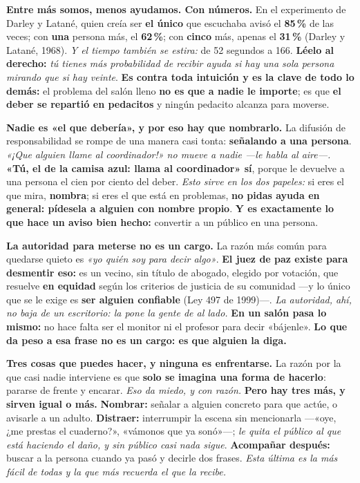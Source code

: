 \documentclass[11pt,letterpaper]{article}
\newcommand{\milcpaso}[3]{%
\Needspace{4\baselineskip}%
\begin{tcolorbox}[enhanced,colback=white,colframe=milcLinea,arc=1.5mm,boxrule=.9pt,
  left=14mm,right=4mm,top=3mm,bottom=3mm,before skip=4pt,after skip=4pt,
  fontupper=\RaggedRight,
  overlay={\node[anchor=north west,circle,fill=#2,text=white,inner sep=0pt,
    minimum size=7.4mm,font=\sffamily\bfseries\small]
    at ([xshift=3.6mm,yshift=-3.2mm]frame.north west) {#1};}]
#3
\end{tcolorbox}}
\begin{document}
\milcpaso{1}{milcTurquesa}{\textbf{Entre más somos, menos ayudamos. Con números.} En el experimento de Darley y Latané, quien creía ser \textbf{el único} que escuchaba avisó el \textbf{85\,\%} de las veces; con \textbf{una} persona más, el \textbf{62\,\%}; con \textbf{cinco} más, apenas el \textbf{31\,\%} (Darley y Latané, 1968). \emph{Y el tiempo también se estira:} de 52 segundos a 166. \textbf{Léelo al derecho:} \emph{tú tienes más probabilidad de recibir ayuda si hay una sola persona mirando que si hay veinte}. \textbf{Es contra toda intuición y es la clave de todo lo demás:} el problema del salón lleno \textbf{no es que a nadie le importe}; es que \textbf{el deber se repartió en pedacitos} y ningún pedacito alcanza para moverse.}
\milcpaso{2}{milcTurquesa}{\textbf{Nadie es «el que debería», y por eso hay que nombrarlo.} La difusión de responsabilidad se rompe de una manera casi tonta: \textbf{señalando a una persona}. \emph{«¡Que alguien llame al coordinador!» no mueve a nadie ---le habla al aire---.} \textbf{«Tú, el de la camisa azul: llama al coordinador» sí}, porque le devuelve a una persona el cien por ciento del deber. \emph{Esto sirve en los dos papeles:} si eres el que mira, \textbf{nombra}; si eres el que está en problemas, \textbf{no pidas ayuda en general: pídesela a alguien con nombre propio}. \textbf{Y es exactamente lo que hace un aviso bien hecho:} convertir a un público en una persona.}
\milcpaso{3}{milcTurquesa}{\textbf{La autoridad para meterse no es un cargo.} La razón más común para quedarse quieto es \emph{«yo quién soy para decir algo»}. \textbf{El juez de paz existe para desmentir eso:} es un vecino, sin título de abogado, elegido por votación, que resuelve \textbf{en equidad} según los criterios de justicia de su comunidad ---y lo único que se le exige es \textbf{ser alguien confiable} (Ley 497 de 1999)---. \emph{La autoridad, ahí, no baja de un escritorio: la pone la gente de al lado.} \textbf{En un salón pasa lo mismo:} no hace falta ser el monitor ni el profesor para decir «bájenle». \textbf{Lo que da peso a esa frase no es un cargo: es que alguien la diga.}}
\milcpaso{4}{milcTurquesa}{\textbf{Tres cosas que puedes hacer, y ninguna es enfrentarse.} La razón por la que casi nadie interviene es que \textbf{solo se imagina una forma de hacerlo}: pararse de frente y encarar. \emph{Eso da miedo, y con razón.} \textbf{Pero hay tres más, y sirven igual o más.} \textbf{Nombrar:} señalar a alguien concreto para que actúe, o avisarle a un adulto. \textbf{Distraer:} interrumpir la escena sin mencionarla ---«oye, ¿me prestas el cuaderno?», «vámonos que ya sonó»---; \emph{le quita el público al que está haciendo el daño, y sin público casi nada sigue}. \textbf{Acompañar después:} buscar a la persona cuando ya pasó y decirle dos frases. \emph{Esta última es la más fácil de todas y la que más recuerda el que la recibe.}}
\end{document}
